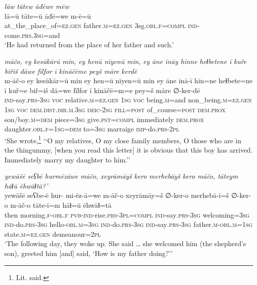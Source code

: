 \ea \label{KŠ.75}
\textit{lāw tātew āđēwe mēw} \\ 
\gll lā=ū tāte=ū āđē=we m-ē=ū \\ 
 at\_the\_place\_of\textsc{\textsc{=ez.gen}} father\textsc{.m}\textsc{\textsc{=ez.gen}} 3sg\textsc{.obl}\textsc{.f}\textsc{=compl} \textsc{ind-}come\textsc{.prs}\textsc{.3sg}=and \\ 
\glt `He had returned from the place of her father and such.'
\z 
 
\ea \label{KŠ.80}
\textit{māčo, ey kesūkārū min, ey henū nīyenū min, ey āne īnāy hīnne heɫbetene ī kuře biřiš dāwe fīlfor ī kināčēme peyš māre kerdē} \\ 
\gll m-āč-o ey kesūkār=ū min ey hen=ū nīyen=ū min ey āne īnā-ī hīn=ne heɫbete=ne ī kuř=e biř=iš dā=we fīlfor ī kināčē=m=e pey=š māre ∅-ker-dē \\ 
 \textsc{ind-}say\textsc{.prs}\textsc{-3sg} \textsc{voc} relative\textsc{.m}\textsc{\textsc{=ez.gen}} \textsc{1sg} \textsc{voc} being\textsc{.m}=and non\_being\textsc{.m}\textsc{\textsc{=ez.gen}} \textsc{1sg} \textsc{voc} \textsc{dem.dist}\textsc{.dir}\textsc{.m}\textsc{.3sg} \textsc{deic}-\textsc{2sg} \textsc{fill}\textsc{=\textsc{post}} of\_course\textsc{=\textsc{post}} \textsc{dem.prox} son/boy\textsc{.m}\textsc{=dem} piece\textsc{=3sg} give\textsc{.pst}\textsc{=compl} immediately \textsc{dem.prox} daughter\textsc{.obl}\textsc{.f}\textsc{=\textsc{1sg}}\textsc{=dem} to\textsc{=3sg} marraige \textsc{imp-}do\textsc{.prs}-\textsc{2pl} \\ 
\glt `She wrote,\footnote{Lit. said.} ‘‘O my relatives, O my close family members, O those who are in the thingummy, [when you read this letter] it is obvious that this boy has arrived. Immediately marry my daughter to him.’'
\z 
 
\ea \label{KŠ.81}
\textit{yewāšē seʕbē hurmēzāwe māčo, xeyrāmāyš kero merhebāyš kero māčo, tāteym hāɫū ēhwāɫtā?’} \\ 
\gll yewāšē seʕbe-ē hur- mi-ēz-ā=we m-āč-o xeyrāmāy=š ∅-ker-o merhebā-ī=š ∅-ker-o m-āč-o tāte-ī=m hāɫ=ū ēhwāɫ=tā \\ 
 then morning\textsc{.f}\textsc{-obl}\textsc{.f} \textsc{pvb-}\textsc{ind-}rise\textsc{.prs}\textsc{-3pl}\textsc{=compl} \textsc{ind-}say\textsc{.prs}\textsc{-3sg} welcoming\textsc{=3sg} \textsc{ind-}do\textsc{.prs}\textsc{-3sg} hello\textsc{-obl}\textsc{.m}\textsc{=3sg} \textsc{ind-}do\textsc{.prs}\textsc{-3sg} \textsc{ind-}say\textsc{.prs}\textsc{-3sg} father\textsc{.m}\textsc{-obl}\textsc{.m}\textsc{=\textsc{1sg}} state\textsc{.m}\textsc{\textsc{=ez.gen}} demeanour=\textsc{2pl} \\ 
\glt `The following day, they woke up. She said … she welcomed him (the shepherd’s son), greeted him [and] said, ‘How is my father doing?’'
\z 
 
